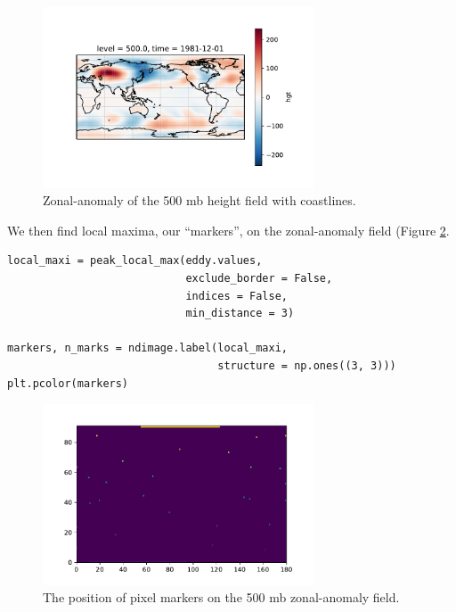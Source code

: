 \documentclass[final, double]{ua-thesis}
\begin{document}
\begin{figure}[h]
 \centerline{\includegraphics[width=19pc]{p2figures/fig_example_out3.pdf}}
  \caption{Zonal-anomaly of the 500 mb height field with coastlines.}\label{fig_example_out3}
\end{figure}

We then find local maxima, our ``markers'', on the zonal-anomaly field (Figure \ref{fig_example_out4}.

\begin{singlespacing}
\begin{verbatim}
local_maxi = peak_local_max(eddy.values,
                            exclude_border = False,
                            indices = False,
                            min_distance = 3)

markers, n_marks = ndimage.label(local_maxi,
                                 structure = np.ones((3, 3)))
plt.pcolor(markers)
\end{verbatim}
\end{singlespacing}

\begin{figure}[h]
 \centerline{\includegraphics[width=19pc]{p2figures/fig_example_out4.pdf}}
  \caption{The position of pixel markers on the 500 mb zonal-anomaly field.}\label{fig_example_out4}
\end{figure}
\end{document}
